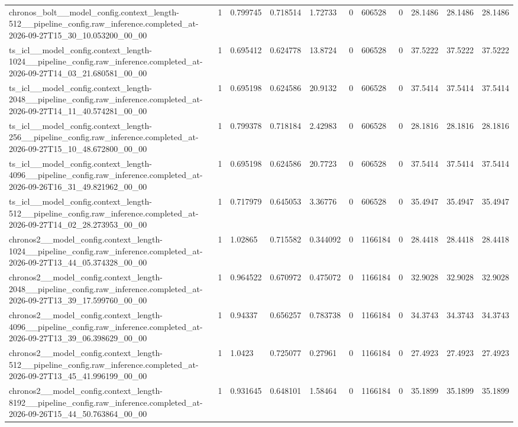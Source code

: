 \begin{tabular}{lllllllllll}
chronos\_bolt\_\_model\_config.context\_length-512\_\_pipeline\_config.raw\_inference.completed\_at-2026-09-27T15\_30\_10.053200\_00\_00 & 1 & 0.799745 & 0.718514 & 1.72733 & 0 & 606528 & 0 & 28.1486 & 28.1486 & 28.1486 \\
ts\_icl\_\_model\_config.context\_length-1024\_\_pipeline\_config.raw\_inference.completed\_at-2026-09-27T14\_03\_21.680581\_00\_00 & 1 & 0.695412 & 0.624778 & 13.8724 & 0 & 606528 & 0 & 37.5222 & 37.5222 & 37.5222 \\
ts\_icl\_\_model\_config.context\_length-2048\_\_pipeline\_config.raw\_inference.completed\_at-2026-09-27T14\_11\_40.574281\_00\_00 & 1 & 0.695198 & 0.624586 & 20.9132 & 0 & 606528 & 0 & 37.5414 & 37.5414 & 37.5414 \\
ts\_icl\_\_model\_config.context\_length-256\_\_pipeline\_config.raw\_inference.completed\_at-2026-09-27T15\_10\_48.672800\_00\_00 & 1 & 0.799378 & 0.718184 & 2.42983 & 0 & 606528 & 0 & 28.1816 & 28.1816 & 28.1816 \\
ts\_icl\_\_model\_config.context\_length-4096\_\_pipeline\_config.raw\_inference.completed\_at-2026-09-26T16\_31\_49.821962\_00\_00 & 1 & 0.695198 & 0.624586 & 20.7723 & 0 & 606528 & 0 & 37.5414 & 37.5414 & 37.5414 \\
ts\_icl\_\_model\_config.context\_length-512\_\_pipeline\_config.raw\_inference.completed\_at-2026-09-27T14\_02\_28.273953\_00\_00 & 1 & 0.717979 & 0.645053 & 3.36776 & 0 & 606528 & 0 & 35.4947 & 35.4947 & 35.4947 \\
chronos2\_\_model\_config.context\_length-1024\_\_pipeline\_config.raw\_inference.completed\_at-2026-09-27T13\_44\_05.374328\_00\_00 & 1 & 1.02865 & 0.715582 & 0.344092 & 0 & 1166184 & 0 & 28.4418 & 28.4418 & 28.4418 \\
chronos2\_\_model\_config.context\_length-2048\_\_pipeline\_config.raw\_inference.completed\_at-2026-09-27T13\_39\_17.599760\_00\_00 & 1 & 0.964522 & 0.670972 & 0.475072 & 0 & 1166184 & 0 & 32.9028 & 32.9028 & 32.9028 \\
chronos2\_\_model\_config.context\_length-4096\_\_pipeline\_config.raw\_inference.completed\_at-2026-09-27T13\_39\_06.398629\_00\_00 & 1 & 0.94337 & 0.656257 & 0.783738 & 0 & 1166184 & 0 & 34.3743 & 34.3743 & 34.3743 \\
chronos2\_\_model\_config.context\_length-512\_\_pipeline\_config.raw\_inference.completed\_at-2026-09-27T13\_45\_41.996199\_00\_00 & 1 & 1.0423 & 0.725077 & 0.27961 & 0 & 1166184 & 0 & 27.4923 & 27.4923 & 27.4923 \\
chronos2\_\_model\_config.context\_length-8192\_\_pipeline\_config.raw\_inference.completed\_at-2026-09-26T15\_44\_50.763864\_00\_00 & 1 & 0.931645 & 0.648101 & 1.58464 & 0 & 1166184 & 0 & 35.1899 & 35.1899 & 35.1899 \\

\end{tabular}
